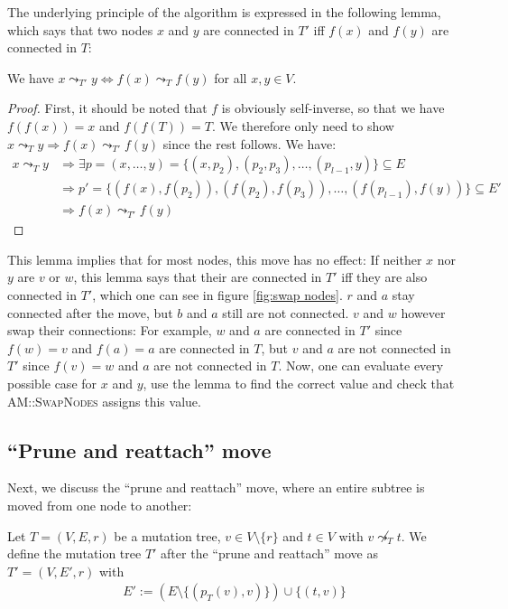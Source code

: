 The underlying principle of the algorithm is expressed in the following lemma, which says that two nodes $x$ and $y$ are connected in $T'$ iff $f(x)$ and $f(y)$ are connected in $T$:

\begin{lemma}
    \label{lem:swap_nodes_property}
    We have $x \leadsto_{T'} y \Leftrightarrow f(x) \leadsto_T f(y)$ for all $x, y \in V$.
\end{lemma}

\begin{proof}
    First, it should be noted that $f$ is obviously self-inverse, so that we have $f(f(x)) = x$ and $f(f(T)) = T$. We therefore only need to show $x \leadsto_{T} y \Rightarrow f(x) \leadsto_{T'} f(y)$ since the rest follows. We have:
    \begin{align*}
        x \leadsto_T y &\Rightarrow \exists p = (x, \dots, y) = \{(x, p_2), (p_2, p_3), \dots, (p_{l-1}, y)\} \subseteq E \\
        &\Rightarrow p' = \{(f(x), f(p_2)), (f(p_2), f(p_3)), \dots, (f(p_{l-1}), f(y))\} \subseteq E' \\
        &\Rightarrow f(x) \leadsto_{T'} f(y)
    \end{align*}
\end{proof}

This lemma implies that for most nodes, this move has no effect: If neither $x$ nor $y$ are $v$ or $w$, this lemma says that their are connected in $T'$ iff they are also connected in $T'$, which one can see in figure \ref{fig:swap nodes}. $r$ and $a$ stay connected after the move, but $b$ and $a$ still are not connected. $v$ and $w$ however swap their connections: For example, $w$ and $a$ are connected in $T'$ since $f(w) = v$ and $f(a) = a$ are connected in $T$, but $v$ and $a$ are not connected in $T'$ since $f(v)=w$ and $a$ are not connected in $T$. Now, one can evaluate every possible case for $x$ and $y$, use the lemma to find the correct value and check that \textsc{AM::SwapNodes} assigns this value.

\subsection{``Prune and reattach'' move}

Next, we discuss the ``prune and reattach'' move, where an entire subtree is moved from one node to another:

\begin{definition}
    \label{def:prune_and_reattach}
    Let $T = (V, E, r)$ be a mutation tree, $v \in V \setminus \{r\}$ and $t \in V$ with $v \not\leadsto_T t$. We define the mutation tree $T'$ after the ``prune and reattach'' move as $T' = (V, E', r)$ with
    \begin{align*}
        E' := (E \setminus \{(p_T(v), v)\}) \cup \{(t, v)\}
    \end{align*}
\end{definition}

